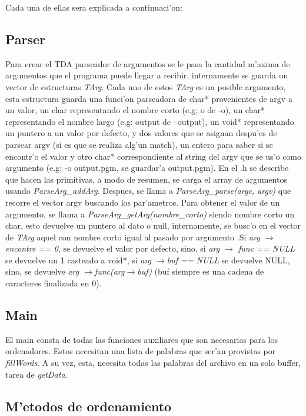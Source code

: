 \documentclass[a4paper,11pt]{article}
\begin{document}
Cada una de ellas sera explicada a continuaci'on:

\subsection{Parser}
Para crear el TDA parseador de argumentos se le pasa la cantidad m'axima de argumentos que el programa puede llegar a recibir, internamente se guarda un vector de estructuras \emph{TArg}. Cada uno de estos \emph{TArg} es un posible argumento, esta estructura guarda una funci'on parseadora de char* provenientes de argv a un valor, un char representando el nombre corto (e.g: o de -o), un char* representando el nombre largo (e.g: output de --output), un void* representando un puntero a un valor por defecto, y dos valores que se asignan despu'es de parsear argv (si es que se realiza alg'un match), un entero para saber si se encontr'o el valor y otro char* correspondiente al string del argv que se us'o como argumento (e.g: -o output.pgm, se guardar'a output.pgm).
En el .h se describe que hacen las primitivas, a modo de resumen, se carga el array de argumentos usando \textit{ParseArg\_addArg}. Despues, se llama a \textit{ParseArg\_parse(argc, argv)} que recorre el vector argv buscando los par'ametros. Para obtener el valor de un argumento, se llama a \textit{ParseArg\_getArg(nombre\_corto)} siendo nombre corto  un char, esto devuelve un puntero al dato o null, internamente, se busc'o en el vector de \textit{TArg} aquel con nombre corto igual al pasado por argumento .Si \textit{arg $\rightarrow$ encontre == 0}, se devuelve el valor por defecto, sino, si \textit{arg $\rightarrow$ func == NULL} se devuelve un 1 casteado a void*, si \textit{arg $\rightarrow$buf == NULL} se devuelve NULL, sino, se devuelve \textit{arg $\rightarrow$func(arg$\rightarrow$buf)} (buf siempre es una cadena de caracteres finalizada en 0).

\subsection{Main}
El main consta de todas las funciones auxiliares que son necesarias para los ordenadores. Estos necesitan una lista de palabras que ser'an provistas por \textit{fillWords}. A su vez, esta, necesita todas las palabras del archivo en un solo buffer, tarea de \textit{getData}.

\subsection{M'etodos de ordenamiento}
\end{document}
